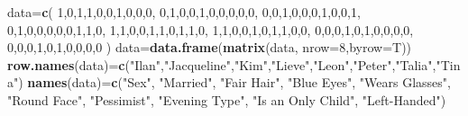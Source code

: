 \documentclass[
]{article}
\newenvironment{Shaded}{\begin{snugshade}}{\end{snugshade}}
\newcommand{\DataTypeTok}[1]{\textcolor[rgb]{0.13,0.29,0.53}{#1}}
\newcommand{\DecValTok}[1]{\textcolor[rgb]{0.00,0.00,0.81}{#1}}
\newcommand{\KeywordTok}[1]{\textcolor[rgb]{0.13,0.29,0.53}{\textbf{#1}}}
\newcommand{\NormalTok}[1]{#1}
\newcommand{\StringTok}[1]{\textcolor[rgb]{0.31,0.60,0.02}{#1}}
\begin{document}
\begin{Shaded}
\begin{Highlighting}[]
\NormalTok{data=}\KeywordTok{c}\NormalTok{(}
\DecValTok{1}\NormalTok{,}\DecValTok{0}\NormalTok{,}\DecValTok{1}\NormalTok{,}\DecValTok{1}\NormalTok{,}\DecValTok{0}\NormalTok{,}\DecValTok{0}\NormalTok{,}\DecValTok{1}\NormalTok{,}\DecValTok{0}\NormalTok{,}\DecValTok{0}\NormalTok{,}\DecValTok{0}\NormalTok{,}
\DecValTok{0}\NormalTok{,}\DecValTok{1}\NormalTok{,}\DecValTok{0}\NormalTok{,}\DecValTok{0}\NormalTok{,}\DecValTok{1}\NormalTok{,}\DecValTok{0}\NormalTok{,}\DecValTok{0}\NormalTok{,}\DecValTok{0}\NormalTok{,}\DecValTok{0}\NormalTok{,}\DecValTok{0}\NormalTok{,}
\DecValTok{0}\NormalTok{,}\DecValTok{0}\NormalTok{,}\DecValTok{1}\NormalTok{,}\DecValTok{0}\NormalTok{,}\DecValTok{0}\NormalTok{,}\DecValTok{0}\NormalTok{,}\DecValTok{1}\NormalTok{,}\DecValTok{0}\NormalTok{,}\DecValTok{0}\NormalTok{,}\DecValTok{1}\NormalTok{,}
\DecValTok{0}\NormalTok{,}\DecValTok{1}\NormalTok{,}\DecValTok{0}\NormalTok{,}\DecValTok{0}\NormalTok{,}\DecValTok{0}\NormalTok{,}\DecValTok{0}\NormalTok{,}\DecValTok{0}\NormalTok{,}\DecValTok{1}\NormalTok{,}\DecValTok{1}\NormalTok{,}\DecValTok{0}\NormalTok{,}
\DecValTok{1}\NormalTok{,}\DecValTok{1}\NormalTok{,}\DecValTok{0}\NormalTok{,}\DecValTok{0}\NormalTok{,}\DecValTok{1}\NormalTok{,}\DecValTok{1}\NormalTok{,}\DecValTok{0}\NormalTok{,}\DecValTok{1}\NormalTok{,}\DecValTok{1}\NormalTok{,}\DecValTok{0}\NormalTok{,}
\DecValTok{1}\NormalTok{,}\DecValTok{1}\NormalTok{,}\DecValTok{0}\NormalTok{,}\DecValTok{0}\NormalTok{,}\DecValTok{1}\NormalTok{,}\DecValTok{0}\NormalTok{,}\DecValTok{1}\NormalTok{,}\DecValTok{1}\NormalTok{,}\DecValTok{0}\NormalTok{,}\DecValTok{0}\NormalTok{,}
\DecValTok{0}\NormalTok{,}\DecValTok{0}\NormalTok{,}\DecValTok{0}\NormalTok{,}\DecValTok{1}\NormalTok{,}\DecValTok{0}\NormalTok{,}\DecValTok{1}\NormalTok{,}\DecValTok{0}\NormalTok{,}\DecValTok{0}\NormalTok{,}\DecValTok{0}\NormalTok{,}\DecValTok{0}\NormalTok{,}
\DecValTok{0}\NormalTok{,}\DecValTok{0}\NormalTok{,}\DecValTok{0}\NormalTok{,}\DecValTok{1}\NormalTok{,}\DecValTok{0}\NormalTok{,}\DecValTok{1}\NormalTok{,}\DecValTok{0}\NormalTok{,}\DecValTok{0}\NormalTok{,}\DecValTok{0}\NormalTok{,}\DecValTok{0}
\NormalTok{)}
\NormalTok{data=}\KeywordTok{data.frame}\NormalTok{(}\KeywordTok{matrix}\NormalTok{(data, }\DataTypeTok{nrow=}\DecValTok{8}\NormalTok{,}\DataTypeTok{byrow=}\NormalTok{T))}
\KeywordTok{row.names}\NormalTok{(data)=}\KeywordTok{c}\NormalTok{(}\StringTok{"Ilan"}\NormalTok{,}\StringTok{"Jacqueline"}\NormalTok{,}\StringTok{"Kim"}\NormalTok{,}\StringTok{"Lieve"}\NormalTok{,}\StringTok{"Leon"}\NormalTok{,}\StringTok{"Peter"}\NormalTok{,}\StringTok{"Talia"}\NormalTok{,}\StringTok{"Tina"}\NormalTok{)}
\KeywordTok{names}\NormalTok{(data)=}\KeywordTok{c}\NormalTok{(}\StringTok{"Sex"}\NormalTok{, }\StringTok{"Married"}\NormalTok{, }\StringTok{"Fair Hair"}\NormalTok{, }\StringTok{"Blue Eyes"}\NormalTok{, }\StringTok{"Wears Glasses"}\NormalTok{, }\StringTok{"Round Face"}\NormalTok{, }\StringTok{"Pessimist"}\NormalTok{, }\StringTok{"Evening Type"}\NormalTok{, }\StringTok{"Is an Only Child"}\NormalTok{, }\StringTok{"Left-Handed"}\NormalTok{)}
\end{Highlighting}
\end{Shaded}
\end{document}
